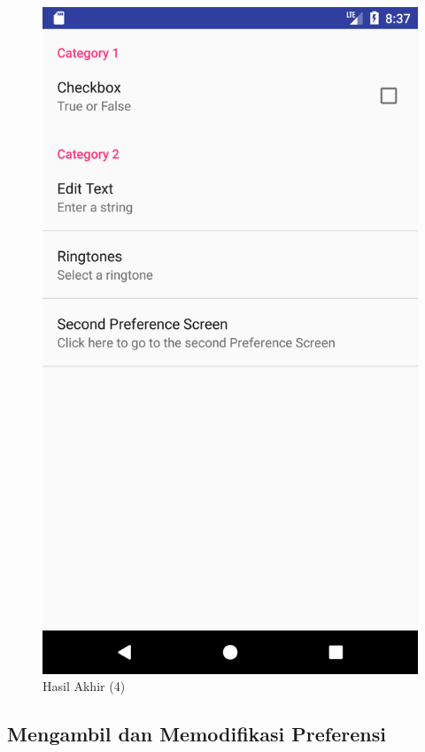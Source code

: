 \documentclass{scrartcl}
\begin{document}
\begin{enumerate}
\begin{figure}[htbp]
\begin{minipage}{.5\textwidth}
				\includegraphics[width=0.7\linewidth]{Screenshot_1497490644}
				\caption{Hasil Akhir (4)}
				\label{fig:screenshot_1497490644}
			\end{minipage}
		\end{figure}
		
	\end{enumerate}

	\subsection{Mengambil dan Memodifikasi Preferensi}
	
\end{document}
